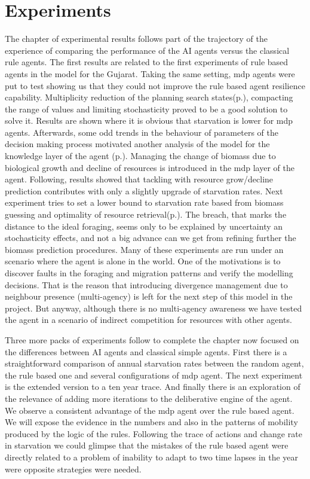 \documentclass[11pt,oneside,a4paper,openright]{report}
\begin{document}
	
\chapter{Experiments}
\label{sec:Experiments}
The chapter of experimental results follows part of the trajectory of the experience of comparing the 
performance of the AI agents versus the classical rule agents. The first results are related to the first
experiments of rule based agents in the model for the Gujarat\cite{JARM2014}. Taking the same setting, 
mdp agents were put to test showing us that they could not improve the rule based agent resilience capability.  
Multiplicity reduction of the planning search states(p.\pageref{sec:ReduccStates}), compacting the range of values and limiting stochasticity proved to be a good solution to solve it. Results are shown where it is obvious that 
starvation is lower for mdp agents. Afterwards, some odd trends in the behaviour of parameters of the decision 
making process motivated another analysis of the model for the knowledge layer of the agent 
(p.\pageref{sec:Divergence}). 
Managing the change of biomass due to biological growth and decline of resources is introduced in the mdp 
layer of the agent. Following, results showed that tackling with resource grow/decline prediction contributes 
with only a slightly upgrade of starvation rates. Next experiment tries to set a lower bound to starvation 
rate based from biomass guessing and optimality of resource retrieval(p.\pageref{sec:NoDepletionExperiment}). The breach, 
that marks the distance to the ideal foraging, seems only to be explained by uncertainty an stochasticity 
effects, and not a big advance can we get from refining further the biomass prediction procedures. Many of 
these experiments are run under an scenario where the agent is alone in the world. One of the motivations is 
to discover faults in the foraging and migration patterns and verify the modelling decisions.
That is the reason that introducing divergence management due to neighbour presence (multi-agency) is left 
for the next step of this model in the project. But anyway, although there is no multi-agency awareness we 
have tested the agent in a scenario of indirect competition for resources with other agents.

Three more packs of experiments follow to complete the chapter now focused on the differences between AI 
agents and classical simple agents. First there is a straightforward comparison of annual starvation rates
between the random agent, the rule based one and several configurations of mdp agent. The next experiment
is the extended version to a ten year trace. And finally there is an exploration of the relevance of adding 
more iterations to the deliberative engine of the agent. We observe a consistent advantage of the mdp agent
over the rule based agent. We will expose the evidence in the numbers and also in the patterns of mobility 
produced by the logic of the rules. Following the trace of actions and change rate in starvation we could 
glimpse that the mistakes of the rule based agent were directly related to a problem of inability to adapt 
to two time lapses in the year were opposite strategies were needed.
\end{document}
